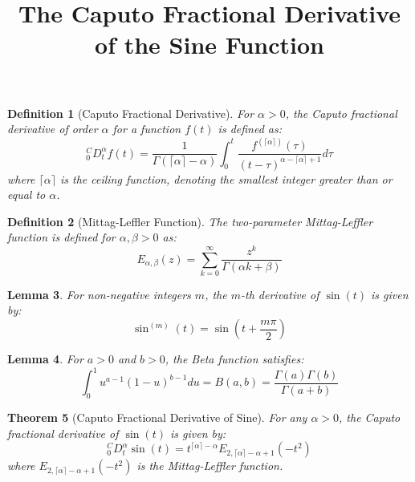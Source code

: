 \documentclass{article}
\title{The Caputo Fractional Derivative of the Sine Function}
\author{}
\date{}
\newtheorem{theorem}{Theorem}
\newtheorem{definition}[theorem]{Definition}
\newtheorem{lemma}[theorem]{Lemma}
\begin{document}
\maketitle

\begin{definition}[Caputo Fractional Derivative]
For $\alpha > 0$, the Caputo fractional derivative of order $\alpha$ for a function $f(t)$ is defined as:
\begin{equation}
_0^CD_t^\alpha f(t) = \frac{1}{\Gamma(\lceil \alpha \rceil - \alpha)} \int_0^t \frac{f^{(\lceil \alpha \rceil)}(\tau)}{(t-\tau)^{\alpha - \lceil \alpha \rceil + 1}} d\tau
\end{equation}
where $\lceil \alpha \rceil$ is the ceiling function, denoting the smallest integer greater than or equal to $\alpha$.
\end{definition}

\begin{definition}[Mittag-Leffler Function]
The two-parameter Mittag-Leffler function is defined for $\alpha, \beta > 0$ as:
\begin{equation}
E_{\alpha,\beta}(z) = \sum_{k=0}^{\infty} \frac{z^k}{\Gamma(\alpha k + \beta)}
\end{equation}
\end{definition}

\begin{lemma}
For non-negative integers $m$, the $m$-th derivative of $\sin(t)$ is given by:
\begin{equation}
\sin^{(m)}(t) = \sin\left(t + \frac{m\pi}{2}\right)
\end{equation}
\end{lemma}

\begin{lemma}
For $a > 0$ and $b > 0$, the Beta function satisfies:
\begin{equation}
\int_0^1 u^{a-1}(1-u)^{b-1} du = B(a,b) = \frac{\Gamma(a)\Gamma(b)}{\Gamma(a+b)}
\end{equation}
\end{lemma}

\begin{theorem}[Caputo Fractional Derivative of Sine]
For any $\alpha > 0$, the Caputo fractional derivative of $\sin(t)$ is given by:
\begin{equation}
_0^CD_t^\alpha \sin(t) = t^{\lceil \alpha \rceil - \alpha} E_{2,\lceil \alpha \rceil - \alpha + 1}(-t^2)
\end{equation}
where $E_{2,\lceil \alpha \rceil - \alpha + 1}(-t^2)$ is the Mittag-Leffler function.
\end{theorem}
\end{document}
